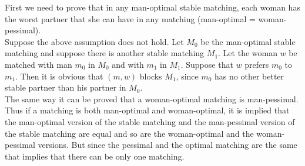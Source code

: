 First we need to prove that in any man-optimal stable matching, each woman has the worst partner that she can have in any matching (man-optimal = woman-pessimal).\\
Suppose the above assumption does not hold. Let $M_0$ be the man-optimal stable matching and suppose there is another stable matching $M_1$. Let the woman $w$ be matched with man $m_0$ in $M_0$ and with $m_1$ in $M_1$. Suppose that $w$ prefers $m_0$ to $m_1$. Then it is obvious that $(m,w)$ blocks $M_1$, since $m_0$ has no other better stable partner than his partner in $M_0$.\\
The same way it can be proved that a woman-optimal matching is man-pessimal.\\
Thus if a matching is both man-optimal and woman-optimal, it is implied that the man-optimal version of the stable matching and the man-pessimal version of the stable matching are equal and so are the woman-optimal and the woman-pessimal versions. But since the pessimal and the optimal matching are the same that implies that there can be only one matching.